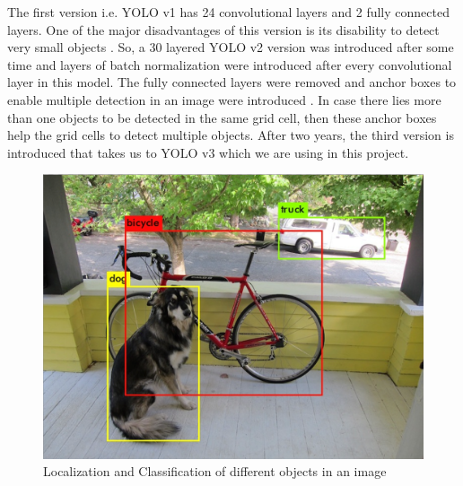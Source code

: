 The first version i.e. YOLO v1 has 24 convolutional layers and 2 fully connected layers. One of the major disadvantages of this version is its disability to detect very small objects \cite{chap_5_article:1}. So, a 30 layered YOLO v2 version was introduced after some time and  layers of batch normalization were introduced after every convolutional layer in this model. The fully connected layers were removed and anchor boxes to enable multiple detection in an image were introduced \cite{chap_5_article:2}. In case there lies more than one objects to be detected in the same grid cell, then these anchor boxes help the grid cells to detect multiple objects. After two years, the third version is introduced that takes us to YOLO v3 which we are using in this project.
\begin{figure}[H]
    \centering
    \captionsetup{justification = centering}
    \includegraphics[scale= 0.25]{CHAPTERS/Chapter-5/images/5.1.png}
    \caption{Localization and Classification of different objects in an image } 
    \label{fig:5.1}
  \end{figure}
